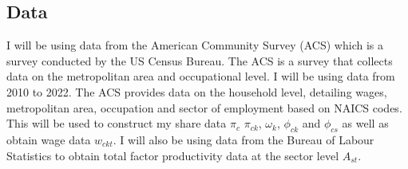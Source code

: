 \documentclass[10pt]{article}
\begin{document}
\subsection{Data}

I will be using data from the American Community Survey (ACS) which is a survey conducted by the US Census Bureau. The ACS is a survey that collects data on the metropolitan area and occupational level. I will be using data from 2010 to 2022. The ACS provides data on the household level, detailing wages, metropolitan area, occupation and sector of employment based on NAICS codes. This will be used to construct my share data $\pi_c$ $\pi_{ck}$, $\omega_k$, $\phi_{ck}$ and $\phi_{cs}$ as well as obtain wage data $w_{ckt}$. I will also be using data from the Bureau of Labour Statistics to obtain total factor productivity data at the sector level $A_{st}$.
\end{document}
